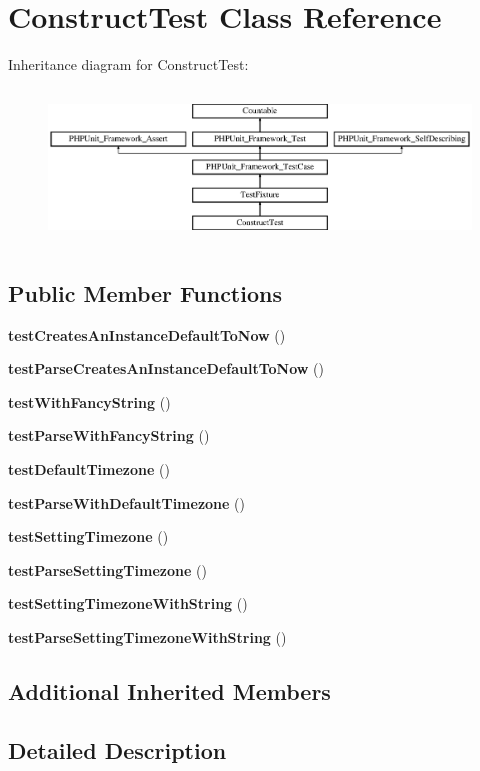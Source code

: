 \section{Construct\+Test Class Reference}
\label{class_construct_test}
Inheritance diagram for Construct\+Test\+:\begin{figure}[H]
\begin{center}
\leavevmode
\includegraphics[height=4.129793cm]{class_construct_test}
\end{center}
\end{figure}
\subsection*{Public Member Functions}
\begin{DoxyCompactItemize}
\item 
{\bf test\+Creates\+An\+Instance\+Default\+To\+Now} ()
\item 
{\bf test\+Parse\+Creates\+An\+Instance\+Default\+To\+Now} ()
\item 
{\bf test\+With\+Fancy\+String} ()
\item 
{\bf test\+Parse\+With\+Fancy\+String} ()
\item 
{\bf test\+Default\+Timezone} ()
\item 
{\bf test\+Parse\+With\+Default\+Timezone} ()
\item 
{\bf test\+Setting\+Timezone} ()
\item 
{\bf test\+Parse\+Setting\+Timezone} ()
\item 
{\bf test\+Setting\+Timezone\+With\+String} ()
\item 
{\bf test\+Parse\+Setting\+Timezone\+With\+String} ()
\end{DoxyCompactItemize}
\subsection*{Additional Inherited Members}


\subsection{Detailed Description}


